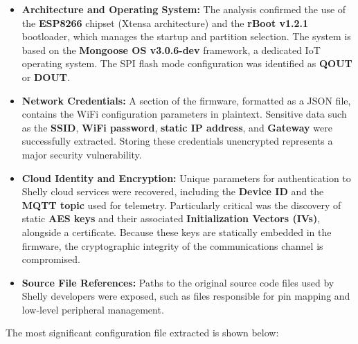\begin{itemize}
    \item \textbf{Architecture and Operating System:} The analysis confirmed the use of the \textbf{ESP8266} chipset (Xtensa architecture) and the \textbf{rBoot v1.2.1} bootloader, which manages the startup and partition selection. The system is based on the \textbf{Mongoose OS v3.0.6-dev} framework, a dedicated IoT operating system. The SPI flash mode configuration was identified as \textbf{QOUT} or \textbf{DOUT}.
    
    \item \textbf{Network Credentials:} A section of the firmware, formatted as a JSON file, contains the WiFi configuration parameters in plaintext. Sensitive data such as the \textbf{SSID}, \textbf{WiFi password}, \textbf{static IP address}, and \textbf{Gateway} were successfully extracted. Storing these credentials unencrypted represents a major security vulnerability.
    
    \item \textbf{Cloud Identity and Encryption:} Unique parameters for authentication to Shelly cloud services were recovered, including the \textbf{Device ID} and the \textbf{MQTT topic} used for telemetry. Particularly critical was the discovery of static \textbf{AES keys} and their associated \textbf{Initialization Vectors (IVs)}, alongside a certificate. Because these keys are statically embedded in the firmware, the cryptographic integrity of the communications channel is compromised.
    
    \item \textbf{Source File References:} Paths to the original source code files used by Shelly developers were exposed, such as files responsible for pin mapping and low-level peripheral management.
\end{itemize}

\noindent The most significant configuration file extracted is shown below:

